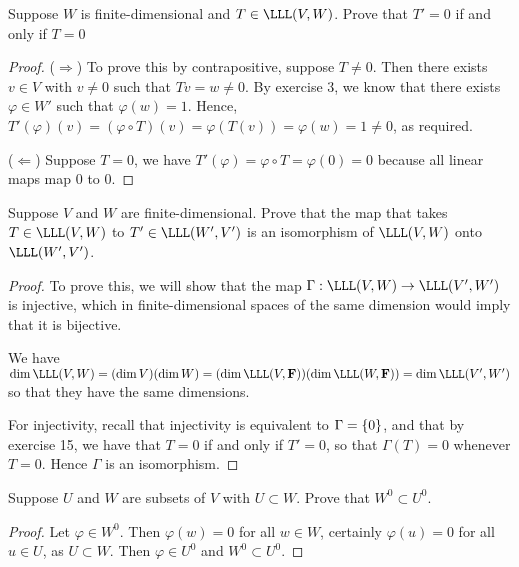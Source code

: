 \begin{exercise}{15}
  Suppose $W$ is finite-dimensional and $T\in\LLL(V,W)$. Prove that $T'=0$ if and only if $T=0$
\end{exercise}
\begin{proof}
 ($\Rightarrow$) To prove this by contrapositive, suppose $T\neq 0$. Then there exists $v\in V$ with $v\neq 0$ such that $Tv=w\neq 0$. By exercise 3, we know that there exists $\varphi\in W'$ such that $\varphi(w)=1$. Hence, $T'(\varphi)(v)= (\varphi\circ T)(v)= \varphi(T(v))= \varphi(w)= 1\neq 0$, as required.
 
 ($\Leftarrow$) Suppose $T=0$, we have $T'(\varphi)= \varphi\circ T= \varphi(0)= 0$ because all linear maps map $0$ to $0$.
\end{proof}

\begin{exercise}{16}
  Suppose $V$ and $W$ are finite-dimensional. Prove that the map that takes $T\in\LLL(V,W)$ to $T'\in\LLL(W',V')$ is an isomorphism of $\LLL(V,W)$ onto $\LLL(W',V')$.
\end{exercise}
\begin{proof}
To prove this, we will show that the map $\Gamma:\LLL(V,W)\rightarrow\LLL(V',W')$ is injective, which in finite-dimensional spaces of the same dimension would imply that it is bijective. 

We have $\dim\LLL(V,W)= (\dim V)(\dim W)= (\dim\LLL(V,\bF))(\dim\LLL(W,\bF))= \dim\LLL(V',W')$ so that they have the same dimensions.

For injectivity, recall that injectivity is equivalent to $\null\Gamma=\{0\}$, and that by exercise 15, we have that $T=0$ if and only if $T'=0$, so that $\Gamma(T)=0$ whenever $T=0$. Hence $\Gamma$ is an isomorphism.
\end{proof}

\begin{exercise}{20}
  Suppose $U$ and $W$ are subsets of $V$ with $U\subset W$. Prove that $W^0\subset U^0$.
\end{exercise}
\begin{proof}
 Let $\varphi\in W^0$. Then $\varphi(w)=0$ for all $w\in W$, certainly $\varphi(u)=0$ for all $u\in U$, as $U\subset W$. Then $\varphi\in U^0$ and $W^0\subset U^0$.
\end{proof}

